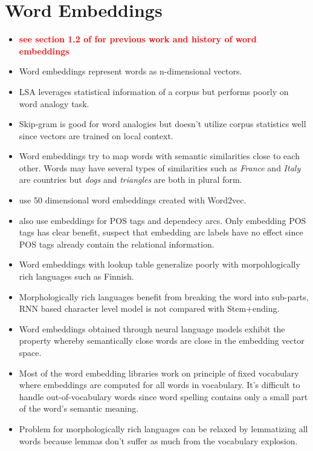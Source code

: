 \documentclass[12pt,a4paper,english
]{tutthesis}
\begin{document}
\section{Word Embeddings}
\begin{itemize}
\item \textbf{\textcolor{red}{see section 1.2 of \cite{Mikolov2013} for previous work and history of word embeddings}}
\item Word embeddings represent words as n-dimensional vectors. \cite{Mikolov2013}
\item LSA leverages statistical information of a corpus but performs poorly on word analogy task. \cite{Pennington2014}
\item Skip-gram is good for word analogies but doesn't utilize corpus statistics well since vectors are trained on local context. \cite{Pennington2014}
\item Word embeddings try to map words with semantic similarities close to each other. Words may have several types of similarities such as \textit{France} and \textit{Italy} are countries but \textit{dogs} and \textit{triangles} are both in plural form. \cite{Mikolov2013a}
\item \cite{Chen2014} use 50 dimensional word embeddings created with Word2vec.
\item \cite{Chen2014} also use embeddings for POS tags and dependecy arcs. Only embedding POS tags has clear benefit, \cite{Chen2014} suspect that embedding arc labels have no effect since POS tags already contain the relational information.
\item Word embeddings with lookup table generalize poorly with morpohlogically rich languages such as Finnish. \cite{Takala2016}
\item Morphologically rich languages benefit from breaking the word into sub-parts, RNN based character level model is not compared with Stem+ending. \cite{Takala2016}
\item Word embeddings obtained through neural language models exhibit the property whereby semantically close words are close in the embedding vector space. \cite{Kim2016}
\item Most of the word embedding libraries work on principle of fixed vocabulary where embeddings are computed for all words in vocabulary. It's difficult to handle out-of-vocabulary words since word spelling contains only a small part of the word's semantic meaning.
\item Problem for morphologically rich languages can be relaxed by lemmatizing all words because lemmas don't suffer as much from the vocabulary explosion.
\end{itemize}
\end{document}
